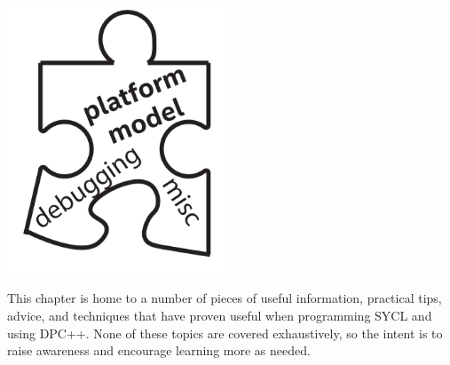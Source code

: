 \begin{center}
	\includegraphics[width=0.5\textwidth]{content/chapter-13/images/1}
\end{center}

This chapter is home to a number of pieces of useful information, practical tips, advice, and techniques that have proven useful when programming SYCL and using DPC++. None of these topics are covered exhaustively, so the intent is to raise awareness and encourage learning more as needed.\par